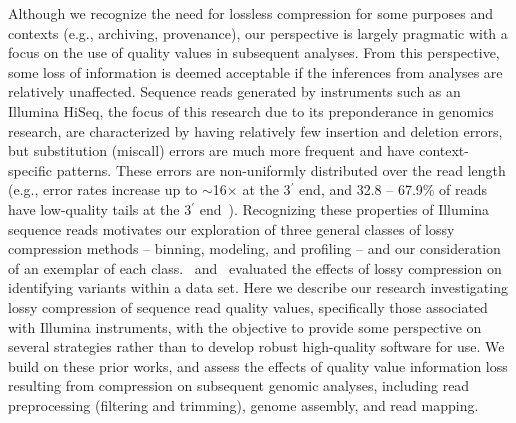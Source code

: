 \documentclass{bioinfo}
\begin{document}
Although we recognize the need for lossless compression for some
purposes and contexts (e.g., archiving, provenance), our perspective
is largely pragmatic with a focus on the use of quality values in
subsequent analyses. From this perspective, some loss of information
is deemed acceptable if the inferences from analyses are relatively
unaffected. Sequence reads generated by instruments such as an
Illumina HiSeq, the focus of this research due to its preponderance in
genomics research, are characterized by having relatively few
insertion and deletion errors, but substitution (miscall) errors are
much more frequent and have context-specific patterns. These errors
are non-uniformly distributed over the read length (e.g., error rates
increase up to $\sim$16$\times$ at the 3$^{\prime}$ end, and 32.8 --
67.9\% of reads have low-quality tails at the 3$^{\prime}$
end~\citep{Minoche:2011km}). Recognizing these properties of Illumina
sequence reads motivates our exploration of three general classes of
lossy compression methods -- binning, modeling, and profiling -- and
our consideration of an exemplar of each class.~\cite{Canovas:2014fr}
and~\cite{janin2013adaptive} evaluated the effects of lossy
compression on identifying variants within a data set. Here we
describe our research investigating lossy compression of sequence read
quality values, specifically those associated with Illumina
instruments, with the objective to provide some perspective on several
strategies rather than to develop robust high-quality software for
use. We build on these prior works, and assess the effects of quality
value information loss resulting from compression on subsequent
genomic analyses, including read preprocessing (filtering and
trimming), genome assembly, and read mapping.
\end{document}
